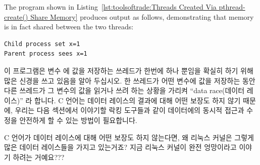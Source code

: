 The program shown in
Listing~\ref{lst:toolsoftrade:Threads Created Via pthread-create() Share Memory}
produces output as follows, demonstrating that memory is in fact
shared between the two threads:
\fi

\vspace{5pt}
\begin{minipage}[t]{\columnwidth}
\scriptsize
\begin{verbatim}
Child process set x=1
Parent process sees x=1
\end{verbatim}
\end{minipage}
\vspace{5pt}

이 프로그램은 변수  에 값을 저장하는 쓰레드가 한번에 하나 뿐임을 확실히
하기 위해 많은 신경을 쓰고 있음을 알아 두십시오.
한 쓰레드가 어떤 변수에 값을 저장하는 동안 다른 쓰레드가 그 변수의 값을 읽거나
쓰려 하는 상황을 가리켜 ``data race(데이터 레이스)'' 라 합니다.
C 언어는 데이터 레이스의 결과에 대해 어떤 보장도 하지 않기 때문에, 우리는 다음
섹션에서 이야기할 락킹 도구들과 같이 데이터에의 동시적 접근과 수정을 안전하게
할 수 있는 방법이 필요합니다.

\QuickQuiz{}
	C 언어가 데이터 레이스에 대해 어떤 보장도 하지 않는다면, 왜 리눅스
	커널은 그렇게 많은 데이터 레이스들을 가지고 있는거죠?
	지금 리눅스 커널이 완전 엉망이라고 이야기 하려는 거예요???


